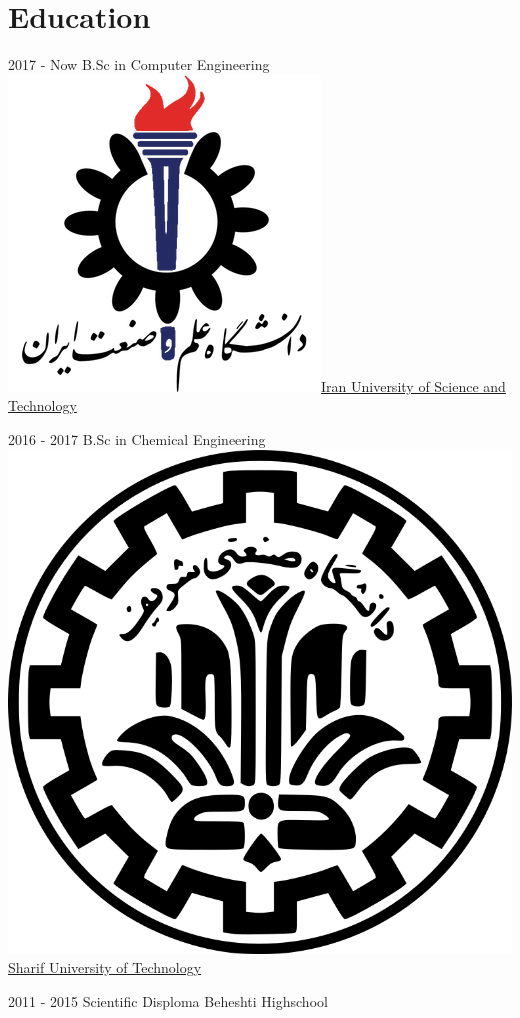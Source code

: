 \documentclass[a4paper]{friggeri-cv}
\begin{document}
\section{Education}
\begin{entrylist}
  \entry
    {2017 - Now}
    {     B.Sc in Computer Engineering}
    {\href{http://www.iust.ac.ir/}{\includegraphics[scale=0.06]{img/IUST_logo_color.png}Iran University of Science and Technology}}
    {}

  \entry
    {2016 - 2017}
    {    B.Sc in Chemical Engineering}
    {\href{http://www.sharif.ir}{\includegraphics[scale=0.015]{img/Sharif_logo.png} Sharif University of Technology}}
    {}

  \entry
    {2011 - 2015}
    {    Scientific Disploma}
    {Beheshti Highschool}
  {}
\end{entrylist}
\end{document}
